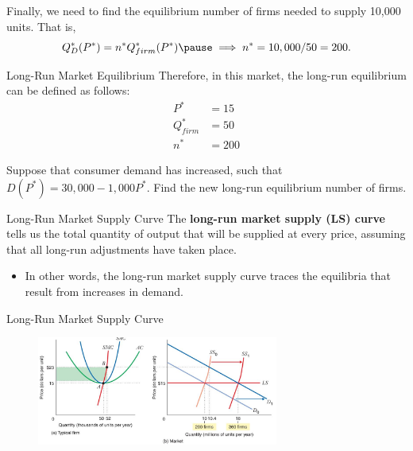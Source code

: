 \documentclass[11pt,t]{beamer}
\begin{document}
\begin{frame}{}
  Finally, we need to find the equilibrium number of firms needed to supply 10,000 units. That is,
  \pause
  $$
    Q^*_D(P^*) = n^* Q_{firm}^*(P^*) \pause \implies n^* = 10,000 / 50 = 200.
  $$
\end{frame}

\begin{frame}{Long-Run Market Equilibrium}
  Therefore, in this market, the long-run equilibrium can be defined as follows:
  \begin{align*}
    P^*        & =15  \\
    Q^*_{firm} & =50  \\
    n^*        & =200
  \end{align*}
\end{frame}

\begin{frame}{}
  Suppose that consumer demand has increased, such that $D(P^*)=30,000-1,000P^*$. Find the new long-run equilibrium number of firms.
\end{frame}

\begin{frame}{}
\end{frame}

\begin{frame}{Long-Run Market Supply Curve}
  The \textbf{long-run market supply (LS) curve} tells us the total quantity of output that will be supplied at every price, assuming that all long-run adjustments have taken place.

  \begin{itemize}
    \item In other words, the long-run market supply curve traces the equilibria that result from increases in demand.
  \end{itemize}
\end{frame}

\begin{frame}{Long-Run Market Supply Curve}
  \begin{figure}
    \includegraphics[width=300px]{figures/fig9_15.jpg}
  \end{figure}
\end{frame}
\end{document}
